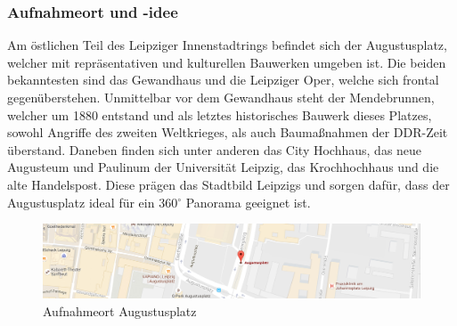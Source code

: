 \documentclass[liststotoc,bibtotoc,fontsize=14pt,]{scrreprt}
\begin{document}
	\subsubsection{Aufnahmeort und -idee}
	Am östlichen Teil des Leipziger Innenstadtrings befindet sich der Augustusplatz, welcher mit repräsentativen und kulturellen Bauwerken umgeben ist. Die beiden bekanntesten sind das Gewandhaus und die Leipziger Oper, welche sich frontal gegenüberstehen. Unmittelbar vor dem Gewandhaus steht der Mendebrunnen, welcher um 1880 entstand und als letztes historisches Bauwerk dieses Platzes, sowohl Angriffe des zweiten Weltkrieges, als auch Baumaßnahmen der DDR-Zeit überstand. Daneben finden sich unter anderen das City Hochhaus, das neue Augusteum und Paulinum der Universität Leipzig, das Krochhochhaus und die alte Handelspost. Diese prägen das Stadtbild Leipzigs und sorgen dafür, dass der Augustusplatz ideal für ein 360$^\circ$ Panorama geeignet ist.
			\begin{figure}[H]
				\includegraphics[width=\linewidth]{img/places/ap_map.jpg}
				\caption{Aufnahmeort Augustusplatz}
				\label{img:ak_map}
			\end{figure}
	
\end{document}
